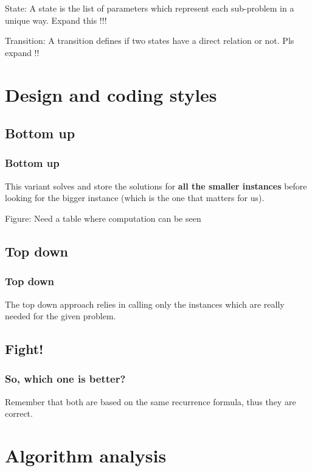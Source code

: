 \documentclass[article]{beamer}
\begin{document}
\begin{frame}
	\begin{block}{State:}
		A state is the list of parameters which represent each sub-problem in a unique way. Expand this !!!
	\end{block}
\end{frame}

\begin{frame}
	\begin{block}{Transition:}
		A transition defines if two states have a direct relation or not. Pls expand !!
	\end{block}
\end{frame}

\section{Design and coding styles}

\subsection{Bottom up}
\begin{frame}
	\frametitle{Bottom up}
	This variant solves and store the solutions for \textbf{all the smaller instances} before looking for the bigger instance (which is the one that matters for us).
	
	\vspace{8mm}
	
	Figure: Need a table where computation can be seen
\end{frame}

\subsection{Top down}
\begin{frame}
	\frametitle{Top down}
	The top down approach relies in calling only the instances which are really needed for the given problem.
\end{frame}

\subsection{Fight!}
\begin{frame}
	\frametitle{So, which one is better?}
	Remember that both are based on the same recurrence formula, thus they are correct.
\end{frame}

\section{Algorithm analysis}
\end{document}
